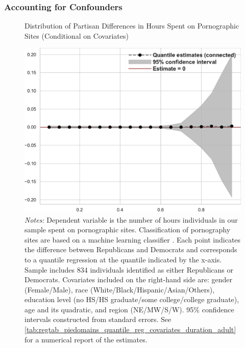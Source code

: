 \documentclass[12pt, letterpaper]{article}
\begin{document}
\FloatBarrier
\subsubsection{Accounting for Confounders}
\begin{figure}[ht]
	\centering
	\caption{Distribution of Partisan Differences in Hours Spent on Pornographic Sites (Conditional on Covariates)}
	\includegraphics[width=.55\linewidth]{../figs/piedomains_quantile_reg_covariates_duration_adult.pdf}
	\caption*{\footnotesize \emph{Notes:} 
		Dependent variable is the number of hours individuals in our sample spent on pornographic sites.
		Classification of pornography sites are based on a machine learning classifier \citep{Chintalapati_piedomains_Predict_the_2022}.
		Each point indicates the difference between Republicans and Democrats and corresponds to a quantile regression at the quantile indicated by the x-axis.
		Sample includes 834 individuals identified as either Republicans or Democrats.
		Covariates included on the right-hand side are: gender (Female/Male), race (White/Black/Hispanic/Asian/Others), education level (no HS/HS graduate/some college/college graduate), age and its quadratic, and region (NE/MW/S/W).
		95\% confidence intervals constructed from standard errors.
		See \cref{tab:regtab_piedomains_quantile_reg_covariates_duration_adult} for a numerical report of the estimates.
	}
	\label{fig:piedomains_quantile_reg_covariates_duration_adult}
\end{figure}
\end{document}
